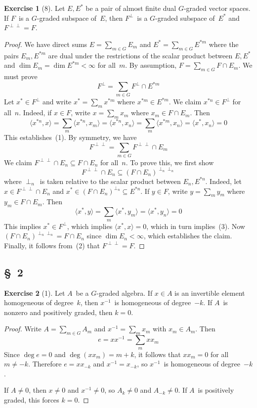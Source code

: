 \documentclass[letterpaper,12pt]{article}
\newcommand{\sect}{\cap}
\newcommand{\sprod}[2]{\langle#1,#2\rangle}
\newcommand{\oc}[1]{#1^{\perp}}
\newcommand{\occ}[1]{#1^{\perp\perp}}
\theoremstyle{definition}
\newtheorem*{exer}{Exercise}
\theoremstyle{remark}
\begin{document}
\begin{exer}[8]
Let \(E,E^*\) be a pair of almost finite dual \(G\)-graded vector spaces. If \(F\)~is a \(G\)-graded subspace of~\(E\), then \(\oc{F}\)~is a \(G\)-graded subspace of~\(E^*\) and \(\occ{F}=F\).
\end{exer}
\begin{proof}
We have direct sums \(E=\sum_{m\in G}E_m\) and \(E^*=\sum_{m\in G}E^{*m}\) where the pairs \(E_m,E^{*m}\) are dual under the restrictions of the scalar product between \(E,E^*\) and \(\dim E_m=\dim E^{*m}<\infty\) for all~\(m\). By assumption, \(F=\sum_{m\in G}F\sect E_m\).
We must prove
\[\oc{F}=\sum_{m\in G}\oc{F}\sect E^{*m}\tag{1}\]
Let \(x^*\in\oc{F}\) and write \(x^*=\sum_m x^{*m}\) where \(x^{*m}\in E^{*m}\). We claim \(x^{*n}\in\oc{F}\) for all~\(n\). Indeed, if \(x\in F\), write \(x=\sum_m x_m\) where \(x_m\in F\sect E_m\). Then
\[\sprod{x^{*n}}{x}=\sum_m\sprod{x^{*n}}{x_m}=\sprod{x^{*n}}{x_n}=\sum_m\sprod{x^{*m}}{x_n}=\sprod{x^*}{x_n}=0\]
This establishes~(1). By symmetry, we have
\[\occ{F}=\sum_{m\in G}\occ{F}\sect E_m\tag{2}\]
We claim \(\occ{F}\sect E_n\subseteq F\sect E_n\) for all~\(n\). To prove this, we first show
\[\occ{F}\sect E_n\subseteq(F\sect E_n)^{\perp_n\perp_n}\tag{3}\]
where \(\perp_n\)~is taken relative to the scalar product between \(E_n,E^{*n}\). Indeed, let \(x\in\occ{F}\sect E_n\) and \(x^*\in(F\sect E_n)^{\perp_n}\subseteq E^{*n}\). If \(y\in F\), write \(y=\sum_m y_m\) where \(y_m\in F\sect E_m\). Then
\[\sprod{x^*}{y}=\sum_m\sprod{x^*}{y_m}=\sprod{x^*}{y_n}=0\]
This implies \(x^*\in\oc{F}\), which implies \(\sprod{x^*}{x}=0\), which in turn implies~(3). Now \((F\sect E_n)^{\perp_n\perp_n}=F\sect E_n\) since \(\dim E_n<\infty\), which establishes the claim. Finally, it follows from~(2) that \(\occ{F}=F\).
\end{proof}

\subsection*{\S~2}
\begin{exer}[1]
Let \(A\)~be a \(G\)-graded algebra. If \(x\in A\) is an invertible element homogeneous of degree~\(k\), then \(x^{-1}\)~is homogeneous of degree~\(-k\). If \(A\)~is nonzero and positively graded, then \(k=0\).
\end{exer}
\begin{proof}
Write \(A=\sum_{m\in G}A_m\) and \(x^{-1}=\sum_m x_m\) with \(x_m\in A_m\). Then
\[e=xx^{-1}=\sum_m xx_m\]
Since \(\deg e=0\) and \(\deg(xx_m)=m+k\), it follows that \(xx_m=0\) for all \(m\ne-k\). Therefore \(e=xx_{-k}\) and \(x^{-1}=x_{-k}\), so \(x^{-1}\)~is homogeneous of degree~\(-k\).

If \(A\ne 0\), then \(x\ne 0\) and \(x^{-1}\ne 0\), so \(A_k\ne 0\) and \(A_{-k}\ne 0\). If \(A\)~is positively graded, this forces \(k=0\).
\end{proof}
\end{document}
